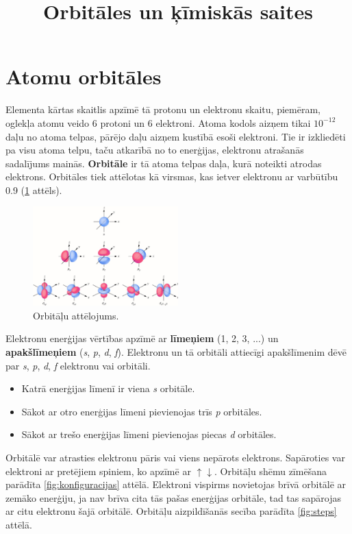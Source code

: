 \documentclass[12pt,a4paper]{article}
\title{\textbf{Orbitāles un ķīmiskās saites}}
\author{}
\date{}
\newcommand{\figref}[1]{\ref{#1} attēls}
\begin{document}
\maketitle

\section{Atomu orbitāles}

Elementa kārtas skaitlis apzīmē tā protonu un elektronu skaitu, piemēram, oglekļa atomu veido 6 protoni un 6 elektroni. Atoma kodols aizņem tikai $10^{-12}$ daļu no atoma telpas, pārējo daļu aizņem kustībā esoši elektroni. Tie ir izkliedēti pa visu atoma telpu, taču atkarībā no to enerģijas, elektronu atrašanās sadalījums mainās. \textbf{Orbitāle} ir tā atoma telpas daļa, kurā noteikti atrodas elektrons. Orbitāles tiek attēlotas kā virsmas, kas ietver elektronu ar varbūtību 0.9 (\figref{fig:orbitales}).

\begin{figure}[H]
    \centering
    \includegraphics[width=0.5\textwidth]{atteli/orbitales.jpg}
    \caption{Orbitāļu attēlojums.}
    \label{fig:orbitales}
\end{figure}

Elektronu enerģijas vērtības apzīmē ar \textbf{līmeņiem} (1, 2, 3, ...) un \textbf{apakšlīmeņiem} (\textit{s}, \textit{p}, \textit{d}, \textit{f}). Elektronu un tā orbitāli attiecīgi apakšlīmenim dēvē par \textit{s}, \textit{p}, \textit{d}, \textit{f} elektronu vai orbitāli.

\begin{itemize}
    \item Katrā enerģijas līmenī ir viena \textit{s} orbitāle.
    \item Sākot ar otro enerģijas līmeni pievienojas trīs \textit{p} orbitāles.
    \item Sākot ar trešo enerģijas līmeni pievienojas piecas \textit{d} orbitāles.
\end{itemize}

Orbitālē var atrasties elektronu pāris vai viens nepārots elektrons. Sapāroties var elektroni ar pretējiem spiniem, ko apzīmē ar $\uparrow \downarrow$. Orbitāļu shēmu zīmēšana parādīta \ref{fig:konfiguracijas} attēlā. Elektroni vispirms novietojas brīvā orbitālē ar zemāko enerģiju, ja nav brīva cita tās pašas enerģijas orbitāle, tad tas sapārojas ar citu elektronu šajā orbitālē. Orbitāļu aizpildīšanās secība parādīta \ref{fig:steps} attēlā.
\end{document}
